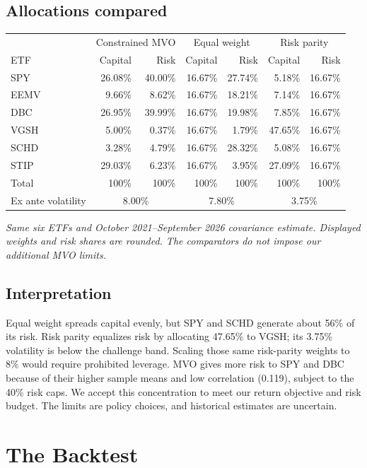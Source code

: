 \documentclass[10pt,a4paper]{article}
\begin{document}
\subsection{Allocations compared}
\begin{center}
\begin{tabular}{@{}lrrrrrr@{}}
\toprule
& \multicolumn{2}{c}{Constrained MVO} & \multicolumn{2}{c}{Equal weight} & \multicolumn{2}{c}{Risk parity} \\
ETF & Capital & Risk & Capital & Risk & Capital & Risk \\
\midrule
SPY &26.08\%&40.00\%&16.67\%&27.74\%&5.18\%&16.67\%\\
EEMV&9.66\%&8.62\%&16.67\%&18.21\%&7.14\%&16.67\%\\
DBC&26.95\%&39.99\%&16.67\%&19.98\%&7.85\%&16.67\%\\
VGSH&5.00\%&0.37\%&16.67\%&1.79\%&47.65\%&16.67\%\\
SCHD&3.28\%&4.79\%&16.67\%&28.32\%&5.08\%&16.67\%\\
STIP&29.03\%&6.23\%&16.67\%&3.95\%&27.09\%&16.67\%\\
\midrule
Total&100\%&100\%&100\%&100\%&100\%&100\%\\
Ex ante volatility&\multicolumn{2}{c}{8.00\%}&\multicolumn{2}{c}{7.80\%}&\multicolumn{2}{c}{3.75\%}\\
\bottomrule
\end{tabular}
\end{center}
\textit{Same six ETFs and October 2021--September 2026 covariance estimate. Displayed weights and risk shares are rounded. The comparators do not impose our additional MVO limits.}

\subsection{Interpretation}
Equal weight spreads capital evenly, but SPY and SCHD generate about 56\% of its risk. Risk parity equalizes risk by allocating 47.65\% to VGSH; its 3.75\% volatility is below the challenge band. Scaling those same risk-parity weights to 8\% would require prohibited leverage. MVO gives more risk to SPY and DBC because of their higher sample means and low correlation (0.119), subject to the 40\% risk caps. We accept this concentration to meet our return objective and risk budget. The limits are policy choices, and historical estimates are uncertain.
\endgroup

\endgroup

\clearpage
\section{The Backtest}\label{sec:backtest}
\end{document}
